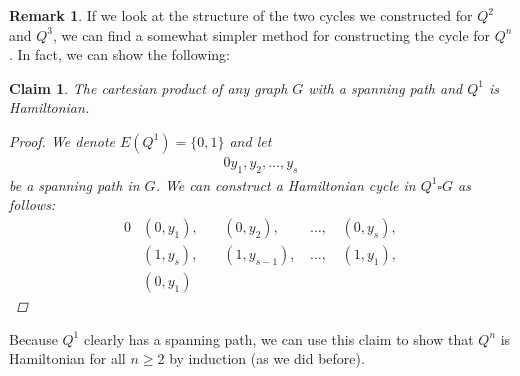 \documentclass{amsart}
\theoremstyle{plain}
\newtheorem*{claim}{\textbf{Claim}}
\theoremstyle{definition}
\newtheorem*{rk}{\textbf{Remark}}
\begin{document}
    \begin{rk}
        If we look at the structure of the two cycles we constructed for $Q^2$ and $Q^3$,
        we can find a somewhat simpler method for constructing the cycle for $Q^n$.
        In fact, we can show the following:
        \begin{claim}
            The cartesian product of any graph $G$ with a spanning path and $Q^1$ is Hamiltonian.
            \begin{proof}
                We denote $E(Q^1) = \{0, 1\}$ and let
                \begin{alignat*}{0}
                    y_1, y_2, \ldots, y_s
                \end{alignat*}
                be a spanning path in $G$.
                We can construct a Hamiltonian cycle in $Q^1 \square G$ as follows:
                \begin{alignat*}{0}
                    & (0, y_1),\, && (0, y_2),\, & \ldots,\, & (0, y_s), \\
                    & (1, y_s),\, && (1, y_{s-1}),\, & \ldots,\, & (1, y_1),\\
                    & (0, y_1) &&&&
                \end{alignat*}
            \end{proof}
        \end{claim}
    \noindent Because $Q^1$ clearly has a spanning path, we can use this claim to show that $Q^n$ is Hamiltonian for all $n \geq 2$ by induction (as we did before).
    \end{rk}
\end{document}
